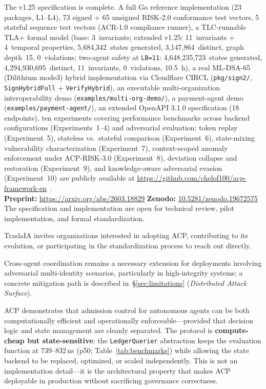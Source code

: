 \documentclass[11pt]{article}
\theoremstyle{definition}
\begin{document}
The v1.25 specification is complete.
A full Go reference implementation (23 packages, L1--L4), 73 signed + 65 unsigned RISK-2.0 conformance test vectors,
5 stateful sequence test vectors (ACR-1.0 compliance runner),
a TLC-runnable TLA+ formal model (base: 3~invariants; extended v1.25: 11~invariants + 4~temporal properties, 5,684,342~states generated, 3,147,864~distinct, graph depth~15, 0~violations; two-agent safety at \texttt{LB=11}: 4,648,235,723~states generated, 4,294,930,695~distinct, 11~invariants, 0~violations, 10.5~h),
a real ML-DSA-65 (Dilithium mode3) hybrid implementation via Cloudflare CIRCL (\texttt{pkg/sign2/}, \texttt{SignHybridFull} + \texttt{VerifyHybrid}),
an executable multi-organization interoperability demo (\texttt{examples/multi-org-demo/}),
a payment-agent demo (\texttt{examples/payment-agent/}),
an extended OpenAPI 3.1.0 specification (18 endpoints),
ten experiments covering performance benchmarks across backend configurations (Experiments~1--4)
and adversarial evaluation: token replay (Experiment~5),
stateless vs.\ stateful comparison (Experiment~6),
state-mixing vulnerability characterization (Experiment~7),
context-scoped anomaly enforcement under ACP-RISK-3.0 (Experiment~8),
deviation collapse and restoration (Experiment~9),
and knowledge-aware adversarial evasion (Experiment~10)
are publicly available at \url{https://github.com/chelof100/acp-framework-en}~\cite{acp-spec}.\\
\textbf{Preprint:} \url{https://arxiv.org/abs/2603.18829} \quad \textbf{Zenodo:} \href{https://doi.org/10.5281/zenodo.19672575}{10.5281/zenodo.19672575}\\
The specification and implementation are open for technical review, pilot implementation, and formal standardization.

TraslaIA invites organizations interested in adopting ACP, contributing to its evolution,
or participating in the standardization process to reach out directly.

Cross-agent coordination remains a necessary extension for deployments involving adversarial
multi-identity scenarios, particularly in high-integrity systems; a concrete mitigation path
is described in~\S\ref{sec:limitations} (\emph{Distributed Attack Surface}).

ACP demonstrates that admission control for autonomous agents can be both computationally
efficient and operationally enforceable---provided that decision logic and state management
are cleanly separated. The protocol is \textbf{compute-cheap but state-sensitive}: the
\texttt{LedgerQuerier} abstraction keeps the evaluation function at 739--832\,ns (p50; Table~\ref{tab:benchmarks}) while
allowing the state backend to be replaced, optimized, or scaled independently.
This is not an implementation detail---it is the architectural property that makes ACP
deployable in production without sacrificing governance correctness.
\end{document}
